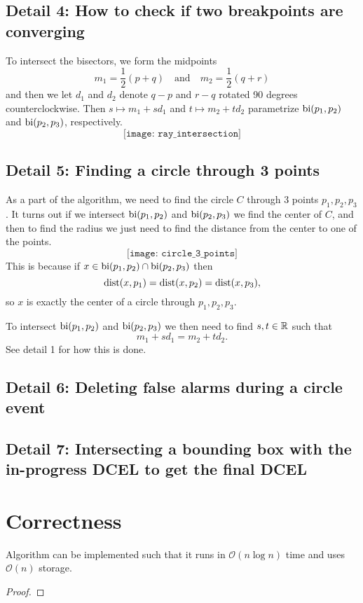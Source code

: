 \subsection*{Detail 4: How to check if two breakpoints are converging}
To intersect the bisectors, we form the midpoints
\[
    m_1 = \frac{1}{2}(p + q) \quad \text{and} \quad m_2 = \frac{1}{2}(q + r)
\]
and then we let $d_1$ and $d_2$ denote $q - p$ and $r - q$ rotated 90 degrees counterclockwise. Then $s \mapsto m_1 + s d_1$ and $t \mapsto m_2 + t d_2$ parametrize $\operatorname{bi}(p_1, p_2)$ and $\operatorname{bi}(p_2, p_3)$, respectively.
\[
    \texttt{[image: ray\_intersection]}
\]

\subsection*{Detail 5: Finding a circle through 3 points}
As a part of the algorithm, we need to find the circle $C$ through 3 points $p_1, p_2, p_3$. It turns out if we intersect $\operatorname{bi}(p_1, p_2)$ and $\operatorname{bi}(p_2, p_3)$ we find the center of $C$, and then to find the radius we just need to find the distance from the center to one of the points.
\[
    \texttt{[image: circle\_3\_points]}
\]
This is because if $x \in \operatorname{bi}(p_1, p_2) \cap \operatorname{bi}(p_2, p_3)$ then
\[
    \operatorname{dist}(x, p_1) = \operatorname{dist}(x, p_2) = \operatorname{dist}(x, p_3),
\]
so $x$ is exactly the center of a circle through $p_1, p_2, p_3$.

To intersect $\operatorname{bi}(p_1, p_2)$ and $\operatorname{bi}(p_2, p_3)$ we then need to find $s, t \in \mathbb{R}$ such that
\[
    m_1 + s d_1 = m_2 + t d_2.
\]
See detail 1 for how this is done.

\subsection*{Detail 6: Deleting false alarms during a circle event}
\subsection*{Detail 7: Intersecting a bounding box with the in-progress DCEL to get the final DCEL}

\section{Correctness}
\begin{lem}
Algorithm \label{alg:fortune} can be implemented such that it runs in $\mathcal{O}(n \log n)$ time and uses $\mathcal{O}(n)$ storage.
\end{lem}
\begin{proof}
\end{proof}